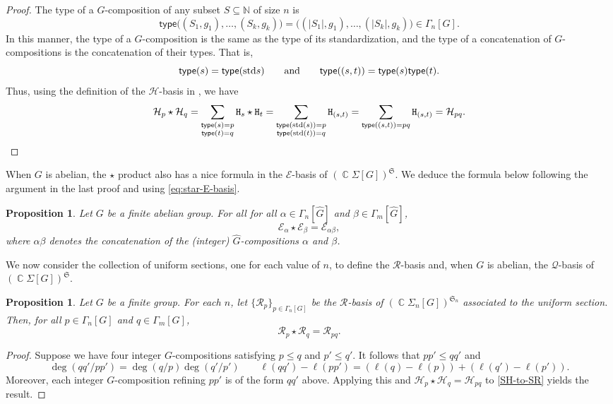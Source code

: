 \documentclass[11pt, oneside, reqno]{amsart}
\newtheorem{prop}[theorem]{Proposition}
\theoremstyle{definition}
\numberwithin{equation}{section}
\DeclareMathOperator{\C}{\mathbb{C}}
\def \kk{\C}
\def \sym{\mathfrak{S}}
\def \wh{\widehat}
\def \gsetcomposition{{\Sigma_n[G]}}
\def \gcomposition{{\Gamma_n[G]}}
\def \hsiao {{\gsetcomposition}}
\def\qqand{\qquad\text{and}\qquad}
\def \type{\mathsf{type}}
\newcommand{\B}[1]{\mathtt{#1}} 			%
\newcommand{\SB}[1]{\mathcal{#1}} 		%
\begin{document}
\begin{proof}
    The type of a $G$-composition of any subset $S \subseteq \mathbb{N}$ of size $n$ is
    \[
        \type\big( (S_1,g_1),\dots,(S_k,g_k) \big) = \big( (|S_1|,g_1),\dots,(|S_k|,g_k) \big) \in \gcomposition.
    \]
    In this manner, the type of a $G$-composition is the same as the type of its standardization,
    and the type of a concatenation of $G$-compositions is the concatenation of their types.
    That is,
    \[ 
        \type(s) = \type({\rm std}s)
        \qqand
        \type((s,t)) = \type(s)\type(t).
    \]
    Thus, using the definition of the $\SB{H}$-basis in , we have
    \[
        \SB{H}_p \star \SB{H}_q = 
        \sum_{ \substack{ \type(s) = p \\ \type(t) = q } } \B{H}_s \star \B{H}_t =
        \sum_{ \substack{ \type({\rm std}(s)) = p \\ \type({\rm std}(t)) = q } } \B{H}_{(s,t)} =
        \sum_{ \type((s,t)) = p q } \B{H}_{(s,t)} = 
        \SB{H}_{p q}. \qedhere
    \]
\end{proof}

When $G$ is abelian, the $\star$ product also has a nice formula in the $\SB{E}$-basis of $(\kk \Sigma[G])^{\sym}$.
We deduce the formula below following the argument in the last proof and using \cref{eq:star-E-basis}.

\begin{prop}
   Let $G$ be a finite abelian group.
    For all for all $\alpha \in \Gamma_n[\wh{G}]$ and $\beta \in \Gamma_m[\wh{G}]$,
    \[
        \SB{E}_\alpha \star \SB{E}_\beta = \SB{E}_{\alpha\beta},
    \]
    where $\alpha\beta$ denotes the concatenation of the (integer) $\wh{G}$-compositions $\alpha$ and $\beta$.
\end{prop}

We now consider the collection of uniform sections, one for each value of $n$, to define the $\SB{R}$-basis and, when $G$ is abelian, the $\SB{Q}$-basis of $(\kk \Sigma[G])^{\sym}$.

\begin{prop}
    Let $G$ be a finite group.
    For each $n$, let $\{\SB{R}_p\}_{p \in \Gamma_n[{G}]}$ be the $\SB{R}$-basis of $(\kk\hsiao)^{\sym_n}$ associated to the uniform section.
    Then, for all $p \in \Gamma_n[{G}]$ and $q \in \Gamma_m[{G}]$,
    \[
        \SB{R}_p \star \SB{R}_q = \SB{R}_{pq}.
    \]
\end{prop}

\begin{proof}
    Suppose we have four integer ${G}$-compositions satisfying $p \leq q$ and $p' \leq q'$.
    It follows that $p p' \leq q q'$ and
    \[
        \deg(q q' / p p') = \deg(q / p) \deg(q' / p')
        \qquad
        \ell(q q') - \ell(p p') = 
        (\ell(q) - \ell(p)) + (\ell(q') - \ell(p')).
    \]
    Moreover, each integer ${G}$-composition refining $p p'$ is of the form $q q'$ above.
    Applying this and $\SB{H}_p \star \SB{H}_q = \SB{H}_{pq}$ to \cref{SH-to-SR} yields the result.
\end{proof}
\end{document}
